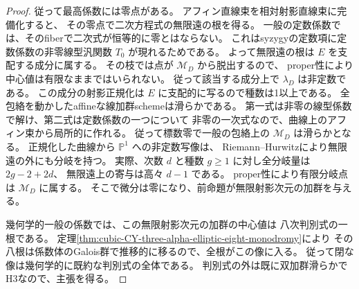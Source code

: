 \begin{proof}
従って最高係数には零点がある。
アフィン直線束を相対射影直線束に完備化すると、
その零点で二次方程式の無限遠の根を得る。
一般の定数係数では、そのfiberで二次式が恒等的に零とはならない。
これはsyzygyの定数項に定数係数の非零線型汎関数 $T_0$ が現れるためである。
よって無限遠の根は $E$ を支配する成分に属する。
その枝では点が $\mathcal M_D$ から脱出するので、
proper性により中心値は有限なままではいられない。
従って該当する成分上で $\lambda_D$ は非定数である。
この成分の射影正規化は $E$ に支配的に写るので種数は1以上である。
全包絡を動かしたaffineな線加群schemeは滑らかである。
第一式は非零の線型係数で解け、第二式は定数係数の一つについて
非零の一次式なので、曲線上のアフィン束から局所的に作れる。
従って標数零で一般の包絡上の $\mathcal M_D$ は滑らかとなる。
正規化した曲線から $\mathbb P^1$ への非定数写像は、
Riemann--Hurwitzにより無限遠の外にも分岐を持つ。
実際、次数 $d$ と種数 $g\ge1$ に対し全分岐量は $2g-2+2d$、
無限遠上の寄与は高々 $d-1$ である。
proper性により有限分岐点は $\mathcal M_D$ に属する。
そこで微分は零になり、前命題が無限射影次元の加群を与える。

幾何学的一般の係数では、この無限射影次元の加群の中心値は
八次判別式の一根である。
定理\ref{thm:cubic-CY-three-alpha-elliptic-eight-monodromy}により
その八根は係数体のGalois群で推移的に移るので、全根がこの像に入る。
従って閉な像は幾何学的に既約な判別式の全体である。
判別式の外は既に双加群滑らかでH3なので、主張を得る。
\end{proof}


